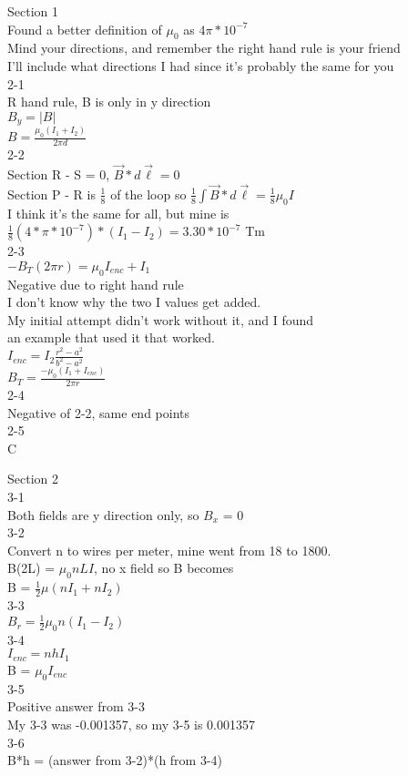 \documentclass{article}
\begin{document}
\vspace{2mm}

\noindent
Section 1 \\
Found a better definition of $\mu_0$ as $4\pi * 10^{-7}$ \\
Mind your directions, and remember the right hand rule is your friend \\
I'll include what directions I had since it's probably the same for you \\
2-1 \\
R hand rule, B is only in y direction \\
$B_y = \vert B \vert$ \\
$B = \frac{\mu_0 (I_1 + I_2)}{2 \pi d}$ \\
2-2 \\
Section R - S = 0, $\vec{B} * d \vec{\ell} = 0$ \\
Section P - R is $\frac{1}{8}$ of the loop so $\frac{1}{8} \int \vec{B} *d \vec{\ell} = \frac{1}{8} \mu_0 I$ \\
I think it's the same for all, but mine is \\
$\frac{1}{8}(4 * \pi*10^{-7}) * (I_1-I_2) = 3.30*10^{-7}$ Tm\\
2-3 \\
$-B_T (2 \pi r) = \mu_0 I_{enc} + I_1$ \\
Negative due to right hand rule \\
I don't know why the two I values get added. \\
My initial attempt didn't work without it, and I found \\
an example that used it that worked. \\
$I_{enc} = I_2 \frac{r^2 - a^2}{b^2 - a^2}$ \\
$B_T = \frac{-\mu_0 (I_1 + I_{enc})}{2 \pi r}$ \\
2-4 \\
Negative of 2-2, same end points \\
2-5 \\
C

\vspace{2mm}

\noindent
Section 2 \\
3-1 \\
Both fields are y direction only, so $B_x$ = 0 \\
3-2 \\
Convert n to wires per meter, mine went from 18 to 1800. \\
B(2L) = $\mu_0 n L I$, no x field so B becomes \\
B = $\frac{1}{2} \mu (n I_1 + n I_2) $ \\
3-3 \\
$B_r = \frac{1}{2} \mu_0 n (I_1 - I_2)$ \\
3-4 \\
$I_{enc} = n h I_1$ \\
B = $\mu_0 I_{enc}$ \\
3-5 \\
Positive answer from 3-3 \\
My 3-3 was -0.001357, so my 3-5 is 0.001357 \\
3-6 \\
B*h = (answer from 3-2)*(h from 3-4) 
\end{document}
